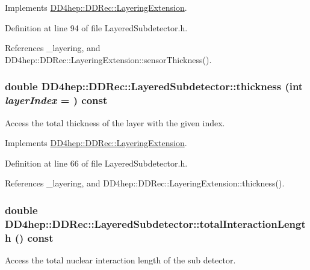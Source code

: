 Implements \hyperlink{class_d_d4hep_1_1_d_d_rec_1_1_layering_extension_a06a960f9de84690eb3383f89d1aada13}{DD4hep::DDRec::LayeringExtension}.

Definition at line 94 of file LayeredSubdetector.h.

References \_\-layering, and DD4hep::DDRec::LayeringExtension::sensorThickness().\hypertarget{class_d_d4hep_1_1_d_d_rec_1_1_layered_subdetector_ad17611716c4b7318db220afb0f93e123}{
\subsubsection[{thickness}]{\setlength{\rightskip}{0pt plus 5cm}double DD4hep::DDRec::LayeredSubdetector::thickness (int {\em layerIndex} = {}) const}}
\label{class_d_d4hep_1_1_d_d_rec_1_1_layered_subdetector_ad17611716c4b7318db220afb0f93e123}


Access the total thickness of the layer with the given index. 

Implements \hyperlink{class_d_d4hep_1_1_d_d_rec_1_1_layering_extension_a6510f43f195374e6adfb4312c27da450}{DD4hep::DDRec::LayeringExtension}.

Definition at line 66 of file LayeredSubdetector.h.

References \_\-layering, and DD4hep::DDRec::LayeringExtension::thickness().\hypertarget{class_d_d4hep_1_1_d_d_rec_1_1_layered_subdetector_a632134e4968e37fad507321af6c87cb9}{
\subsubsection[{totalInteractionLength}]{\setlength{\rightskip}{0pt plus 5cm}double DD4hep::DDRec::LayeredSubdetector::totalInteractionLength () const}}
\label{class_d_d4hep_1_1_d_d_rec_1_1_layered_subdetector_a632134e4968e37fad507321af6c87cb9}


Access the total nuclear interaction length of the sub detector. 


